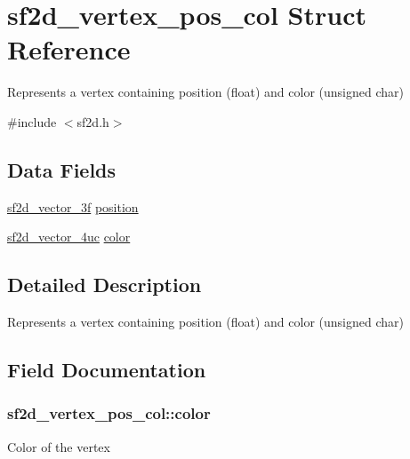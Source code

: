 \hypertarget{structsf2d__vertex__pos__col}{}\section{sf2d\+\_\+vertex\+\_\+pos\+\_\+col Struct Reference}
\label{structsf2d__vertex__pos__col}


Represents a vertex containing position (float) and color (unsigned char)  




{\ttfamily \#include $<$sf2d.\+h$>$}

\subsection*{Data Fields}
\begin{DoxyCompactItemize}
\item 
\hyperlink{structsf2d__vector__3f}{sf2d\+\_\+vector\+\_\+3f} \hyperlink{structsf2d__vertex__pos__col_a72c48b1c976984ef0512a28e8af7a1e4}{position}
\item 
\hyperlink{structsf2d__vector__4uc}{sf2d\+\_\+vector\+\_\+4uc} \hyperlink{structsf2d__vertex__pos__col_a1cac80a51f070a889a4bea2756cab7b9}{color}
\end{DoxyCompactItemize}


\subsection{Detailed Description}
Represents a vertex containing position (float) and color (unsigned char) 

\subsection{Field Documentation}
\hypertarget{structsf2d__vertex__pos__col_a1cac80a51f070a889a4bea2756cab7b9}{}
\subsubsection[{color}]{ sf2d\+\_\+vertex\+\_\+pos\+\_\+col\+::color}\label{structsf2d__vertex__pos__col_a1cac80a51f070a889a4bea2756cab7b9}
Color of the vertex \hypertarget{structsf2d__vertex__pos__col_a72c48b1c976984ef0512a28e8af7a1e4}{}

